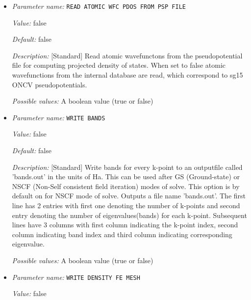 \begin{itemize}
\item {\it Parameter name:} {\tt READ ATOMIC WFC PDOS FROM PSP FILE}
\label{parameters:Post_2dprocessing Options/READ ATOMIC WFC PDOS FROM PSP FILE}
\label{parameters:Post_2dprocessing_20Options/READ_20ATOMIC_20WFC_20PDOS_20FROM_20PSP_20FILE}


{\it Value:} false


{\it Default:} false


{\it Description:} [Standard] Read atomic wavefunctons from the pseudopotential file for computing projected density of states. When set to false atomic wavefunctions from the internal database are read, which correspond to sg15 ONCV pseudopotentials.


{\it Possible values:} A boolean value (true or false)
\item {\it Parameter name:} {\tt WRITE BANDS}
\label{parameters:Post_2dprocessing Options/WRITE BANDS}
\label{parameters:Post_2dprocessing_20Options/WRITE_20BANDS}


{\it Value:} false


{\it Default:} false


{\it Description:} [Standard] Write bands for every k-point to an outputfile called 'bands.out' in the units of Ha. This can be used after GS (Ground-state) or NSCF (Non-Self consistent field iteration) modes of solve. This option is by default on for NSCF mode of solve. Outputs a file name 'bands.out'. The first line has 2 entries with first one denoting the number of k-points and second entry denoting the number of eigenvalues(bands) for each k-point. Subsequent lines have 3 columns with first column indicating the k-point index, second column indicating band index and third column indicating corresponding eigenvalue.


{\it Possible values:} A boolean value (true or false)
\item {\it Parameter name:} {\tt WRITE DENSITY FE MESH}
\label{parameters:Post_2dprocessing Options/WRITE DENSITY FE MESH}
\label{parameters:Post_2dprocessing_20Options/WRITE_20DENSITY_20FE_20MESH}


{\it Value:} false



\end{itemize}
